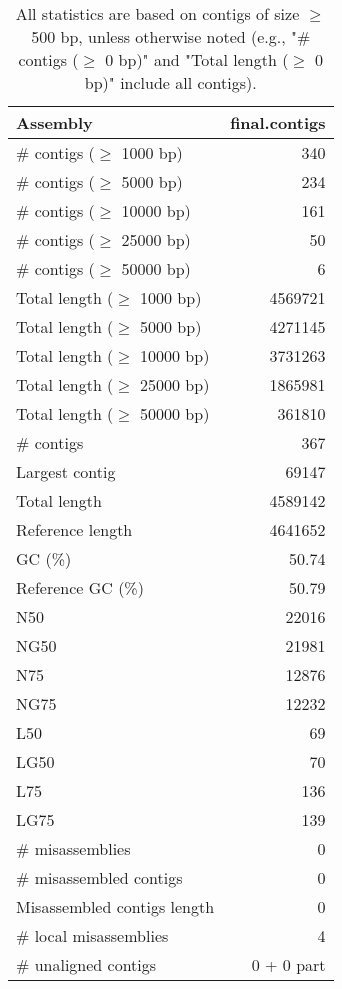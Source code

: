 \documentclass[12pt,a4paper]{article}
\begin{document}
\begin{table}[ht]
\begin{center}
\caption{All statistics are based on contigs of size $\geq$ 500 bp, unless otherwise noted (e.g., "\# contigs ($\geq$ 0 bp)" and "Total length ($\geq$ 0 bp)" include all contigs).}
\begin{tabular}{|l*{1}{|r}|}
\hline
Assembly & final.contigs \\ \hline
\# contigs ($\geq$ 1000 bp) & 340 \\ \hline
\# contigs ($\geq$ 5000 bp) & 234 \\ \hline
\# contigs ($\geq$ 10000 bp) & 161 \\ \hline
\# contigs ($\geq$ 25000 bp) & 50 \\ \hline
\# contigs ($\geq$ 50000 bp) & 6 \\ \hline
Total length ($\geq$ 1000 bp) & 4569721 \\ \hline
Total length ($\geq$ 5000 bp) & 4271145 \\ \hline
Total length ($\geq$ 10000 bp) & 3731263 \\ \hline
Total length ($\geq$ 25000 bp) & 1865981 \\ \hline
Total length ($\geq$ 50000 bp) & 361810 \\ \hline
\# contigs & 367 \\ \hline
Largest contig & 69147 \\ \hline
Total length & 4589142 \\ \hline
Reference length & 4641652 \\ \hline
GC (\%) & 50.74 \\ \hline
Reference GC (\%) & 50.79 \\ \hline
N50 & 22016 \\ \hline
NG50 & 21981 \\ \hline
N75 & 12876 \\ \hline
NG75 & 12232 \\ \hline
L50 & 69 \\ \hline
LG50 & 70 \\ \hline
L75 & 136 \\ \hline
LG75 & 139 \\ \hline
\# misassemblies & 0 \\ \hline
\# misassembled contigs & 0 \\ \hline
Misassembled contigs length & 0 \\ \hline
\# local misassemblies & 4 \\ \hline
\# unaligned contigs & 0 + 0 part \\ \hline

\end{tabular}
\end{center}
\end{table}
\end{document}
